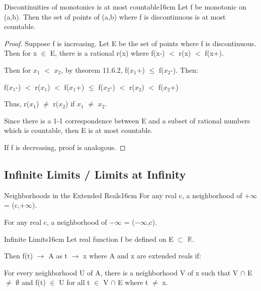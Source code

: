     \begin{wtheorem}{Discontinuities of monotonics is at most countable}{16cm}
        Let f be monotonic on (a,b).
        Then the set of points of (a,b) where f is discontinuous is
        at most countable.
    \end{wtheorem}

    \begin{proof}
        Suppose f is increasing.
        Let E be the set of points where f is discontinuous.
        Then for x $\in$ E, there is a rational r(x) where
        f(x-) $<$ r(x) $<$ f(x+).
        
        Then for $x_1$ $<$ $x_2$, by {\color{red} theorem 11.6.2},
        f($x_1$+) $\leq$ f($x_2$-). Then:

        \hspace{1cm}
        f($x_1$-) $<$ r($x_1$) $<$ f($x_1$+)
        $\leq$ f($x_2$-) $<$ r($x_2$) $<$ f($x_2$+)

        Thus, r($x_1$) $\not =$ r($x_2$) if $x_1$ $\not =$ $x_2$.

        Since there is a 1-1 correspondence between E and a subset
        of rational numbers which is countable, then E is at most countable.

        If f is decreasing, proof is analogous.
    \end{proof}

    \vspace{0.5cm}





\subsection{ Infinite Limits / Limits at Infinity }

    \begin{definition}{Neighborhoods in the Extended Reals}{16cm}
        For any real c, a neighborhood of $+\infty$ = (c,$+\infty$).

        For any real c, a neighborhood of $-\infty$ = ($-\infty$,c).        
    \end{definition}

    \vspace{0.5cm}



    \begin{definition}{Infinite Limits}{16cm}
        Let real function f be defined on E $\subset$ $\mathbb{R}$.

        Then f(t) $\rightarrow$ A as t $\rightarrow$ x where A and x
        are extended reals if:
        
        \begin{adjustbox}{minipage=15cm, right, vspace=0.1cm 0cm}
            For every neighborhood U of A,
            there is a neighborhood V of x such that V $\cap$ E $\not =$ $\emptyset$
            and f(t) $\in$ U for all t $\in$ V $\cap$ E where t $\not =$ x.
        \end{adjustbox}        
    \end{definition}

